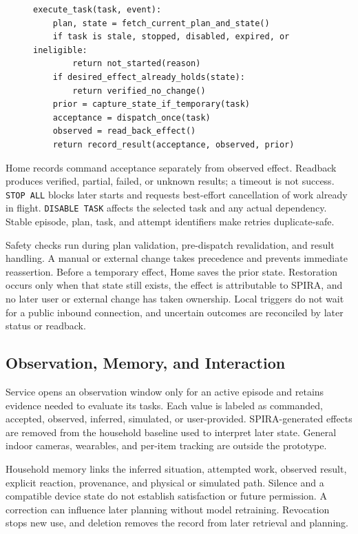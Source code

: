 \documentclass[conference]{IEEEtran}
\begin{document}
\begin{figure}[!t]
\noindent\begin{minipage}{\columnwidth}
\begin{lstlisting}
execute_task(task, event):
    plan, state = fetch_current_plan_and_state()
    if task is stale, stopped, disabled, expired, or ineligible:
        return not_started(reason)
    if desired_effect_already_holds(state):
        return verified_no_change()
    prior = capture_state_if_temporary(task)
    acceptance = dispatch_once(task)
    observed = read_back_effect()
    return record_result(acceptance, observed, prior)
\end{lstlisting}
\end{minipage}
\end{figure}
Home records command acceptance separately from observed effect. Readback produces verified, partial, failed, or unknown results; a timeout is not success. \texttt{STOP ALL} blocks later starts and requests best-effort cancellation of work already in flight. \texttt{DISABLE TASK} affects the selected task and any actual dependency. Stable episode, plan, task, and attempt identifiers make retries duplicate-safe.

Safety checks run during plan validation, pre-dispatch revalidation, and result handling. A manual or external change takes precedence and prevents immediate reassertion. Before a temporary effect, Home saves the prior state. Restoration occurs only when that state still exists, the effect is attributable to SPIRA, and no later user or external change has taken ownership. Local triggers do not wait for a public inbound connection, and uncertain outcomes are reconciled by later status or readback.

\subsection{Observation, Memory, and Interaction}
Service opens an observation window only for an active episode and retains evidence needed to evaluate its tasks. Each value is labeled as commanded, accepted, observed, inferred, simulated, or user-provided. SPIRA-generated effects are removed from the household baseline used to interpret later state. General indoor cameras, wearables, and per-item tracking are outside the prototype.

Household memory links the inferred situation, attempted work, observed result, explicit reaction, provenance, and physical or simulated path. Silence and a compatible device state do not establish satisfaction or future permission. A correction can influence later planning without model retraining. Revocation stops new use, and deletion removes the record from later retrieval and planning.
\end{document}
